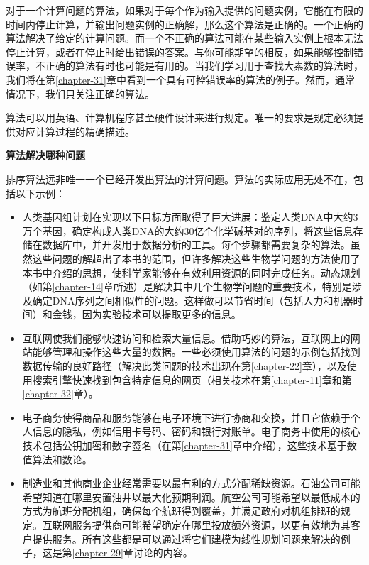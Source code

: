 \documentclass[lang=cn,newtx,10pt,scheme=chinese]{elegantbook}
\begin{document}
对于一个计算问题的算法，如果对于每个作为输入提供的问题实例，它能在有限的时间内停止计算，并输出问题实例的正确解，那么这个算法是正确的。一个正确的算法解决了给定的计算问题。而一个不正确的算法可能在某些输入实例上根本无法停止计算，或者在停止时给出错误的答案。与你可能期望的相反，如果能够控制错误率，不正确的算法有时也可能是有用的。当我们学习用于查找大素数的算法时，我们将在第\ref{chapter-31}章中看到一个具有可控错误率的算法的例子。然而，通常情况下，我们只关注正确的算法。

算法可以用英语、计算机程序甚至硬件设计来进行规定。唯一的要求是规定必须提供对应计算过程的精确描述。

\textbf{算法解决哪种问题}

排序算法远非唯一一个已经开发出算法的计算问题。算法的实际应用无处不在，包括以下示例：

\begin{itemize}
    \item 人类基因组计划在实现以下目标方面取得了巨大进展：鉴定人类DNA中大约3万个基因，确定构成人类DNA的大约30亿个化学碱基对的序列，将这些信息存储在数据库中，并开发用于数据分析的工具。每个步骤都需要复杂的算法。虽然这些问题的解超出了本书的范围，但许多解决这些生物学问题的方法使用了本书中介绍的思想，使科学家能够在有效利用资源的同时完成任务。动态规划（如第\ref{chapter-14}章所述）是解决其中几个生物学问题的重要技术，特别是涉及确定DNA序列之间相似性的问题。这样做可以节省时间（包括人力和机器时间）和金钱，因为实验技术可以提取更多的信息。
    \item 互联网使我们能够快速访问和检索大量信息。借助巧妙的算法，互联网上的网站能够管理和操作这些大量的数据。一些必须使用算法的问题的示例包括找到数据传输的良好路径（解决此类问题的技术出现在第\ref{chapter-22}章），以及使用搜索引擎快速找到包含特定信息的网页（相关技术在第\ref{chapter-11}章和第\ref{chapter-32}章）。
    \item 电子商务使得商品和服务能够在电子环境下进行协商和交换，并且它依赖于个人信息的隐私，例如信用卡号码、密码和银行对账单。电子商务中使用的核心技术包括公钥加密和数字签名（在第\ref{chapter-31}章中介绍），这些技术基于数值算法和数论。
    \item 制造业和其他商业企业经常需要以最有利的方式分配稀缺资源。石油公司可能希望知道在哪里安置油井以最大化预期利润。航空公司可能希望以最低成本的方式为航班分配机组，确保每个航班得到覆盖，并满足政府对机组排班的规定。互联网服务提供商可能希望确定在哪里投放额外资源，以更有效地为其客户提供服务。所有这些都是可以通过将它们建模为线性规划问题来解决的例子，这是第\ref{chapter-29}章讨论的内容。
\end{itemize}
\end{document}
